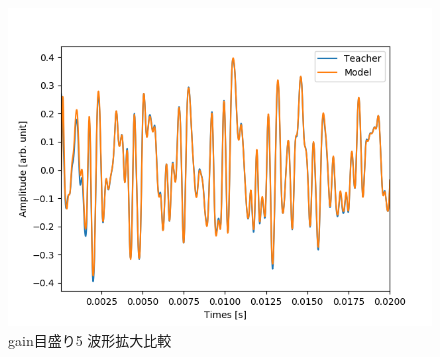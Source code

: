 \documentclass{jreport}		%
\begin{document}
\begin{figure}[htbp]
 \begin{center}
  \includegraphics[width=150mm]{gain5_output_hikaku.png}
 \end{center}
 \caption{gain目盛り5 波形拡大比較}
 \label{fig:one}
\end{figure}
\end{document}
